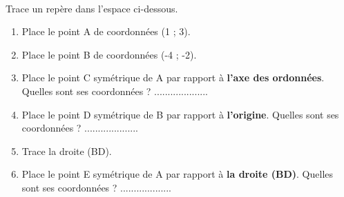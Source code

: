 \documentclass[a4paper,11pt]{article}
\newcommand{\myarrow}{-{Latex[length=3mm, width=2mm]}}
\begin{document}
\begin{question}[(7 points)]\

	Trace un repère dans l'espace ci-dessous.

	\vspace{15cm}

	\begin{enumerate}[1)]
		\item Place le point A de coordonnées (1 ; 3).
		\item Place le point B de coordonnées (-4 ; -2).
		\item Place le point C symétrique de A par rapport à \textbf{l'axe des ordonnées}. Quelles sont ses coordonnées ? ....................
		\item Place le point D symétrique de B par rapport à \textbf{l'origine}. Quelles sont ses coordonnées ? ....................
		\item Trace la droite (BD).
		\item Place le point E symétrique de A par rapport à \textbf{la droite (BD)}.  Quelles sont ses coordonnées ? ...................
	\end{enumerate}
\end{question}




\end{document}
